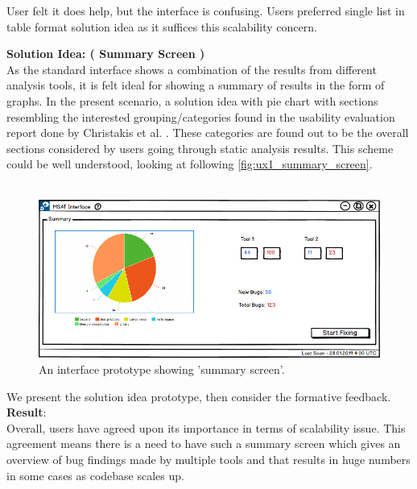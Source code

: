 \begin{myboxi}
User felt it does help, but the interface is confusing. Users preferred single list in table format solution idea as it suffices this scalability concern.
\end{myboxi}


\textbf{Solution Idea: ( Summary Screen )} \\

As the standard interface shows a combination of the results from different analysis tools, it is felt ideal for showing a summary of results in the form of graphs. In the present scenario, a solution idea with pie chart with sections resembling the interested grouping/categories found in the usability evaluation report done by Christakis et al. \cite{CB16}. These categories are found out to be the overall sections considered by users going through static analysis results.  This scheme could be well understood, looking at following \autoref{fig:ux1_summary_screen}. \\ \\


\begin{figure}[hbt!]
	\centering
	\includegraphics[width=\linewidth]{figures/ux1_summary_screen}
	\caption{An interface prototype showing 'summary screen'.}
	\label{fig:ux1_summary_screen}
\end{figure}

We present the solution idea prototype, then consider the formative feedback. \\

\textbf{Result}: \\

Overall, users have agreed upon its importance in terms of scalability issue. This agreement means there is a need to have such a summary screen which gives an overview of bug findings made by multiple tools and that results in huge numbers in some cases as codebase scales up. \\ \\

